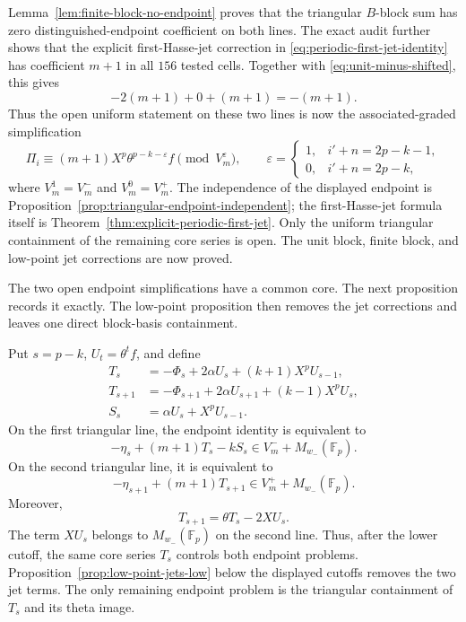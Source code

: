 Lemma~\ref{lem:finite-block-no-endpoint} proves that the triangular
$B$-block sum has zero distinguished-endpoint coefficient on both lines.
The exact audit further shows that the explicit first-Hasse-jet correction in
\eqref{eq:periodic-first-jet-identity} has coefficient $m+1$ in all
$156$ tested cells.  Together with \eqref{eq:unit-minus-shifted}, this gives
\[
 -2(m+1)+0+(m+1)=-(m+1).
\]
Thus the open uniform statement on these two lines is now the
associated-graded simplification
\begin{equation}\label{eq:projection-endpoint-target}
 \Pi_i\equiv (m+1)X^p\theta^{p-k-\varepsilon}f
 \pmod{V_m^\varepsilon},
 \qquad \varepsilon=
 \begin{cases}
  1,&i'+n=2p-k-1,\\
  0,&i'+n=2p-k,
 \end{cases}
\end{equation}
where $V_m^1=V_m^-$ and $V_m^0=V_m^+$.  The independence of the
displayed endpoint is Proposition~\ref{prop:triangular-endpoint-independent};
the first-Hasse-jet formula itself is Theorem~\ref{thm:explicit-periodic-first-jet}.
Only the uniform triangular containment of the remaining core series is
open.  The unit block, finite block, and low-point jet corrections are now
proved.

The two open endpoint simplifications have a common core.  The next
proposition records it exactly.  The low-point proposition then removes the
jet corrections and leaves one direct block-basis containment.

\begin{proposition}
\label{prop:endpoint-common-core}
Put $s=p-k$, $U_t=\theta^t f$, and define
\begin{align*}
 T_s&=-\Phi_s+2\alpha U_s+(k+1)X^pU_{s-1},\\
 T_{s+1}&=-\Phi_{s+1}+2\alpha U_{s+1}+(k-1)X^pU_s,\\
 S_s&=\alpha U_s+X^pU_{s-1}.
\end{align*}
On the first triangular line, the endpoint identity is equivalent to
\begin{equation}
\label{eq:first-endpoint-core}
 -\eta_s+(m+1)T_s-kS_s
 \in V_m^-+M_{w_-}(\mathbb F_p).
\end{equation}
On the second triangular line, it is equivalent to
\begin{equation}
\label{eq:second-endpoint-core}
 -\eta_{s+1}+(m+1)T_{s+1}
 \in V_m^++M_{w_-}(\mathbb F_p).
\end{equation}
Moreover,
\begin{equation}
\label{eq:endpoint-core-theta-bridge}
 T_{s+1}=\theta T_s-2XU_s.
\end{equation}
The term $XU_s$ belongs to $M_{w_-}(\mathbb F_p)$ on the second line.
Thus, after the lower cutoff, the same core series $T_s$ controls both
endpoint problems.  Proposition~\ref{prop:low-point-jets-low} below the
displayed cutoffs removes the two jet terms.  The only remaining endpoint
problem is the triangular containment of $T_s$ and its theta image.
\end{proposition}

